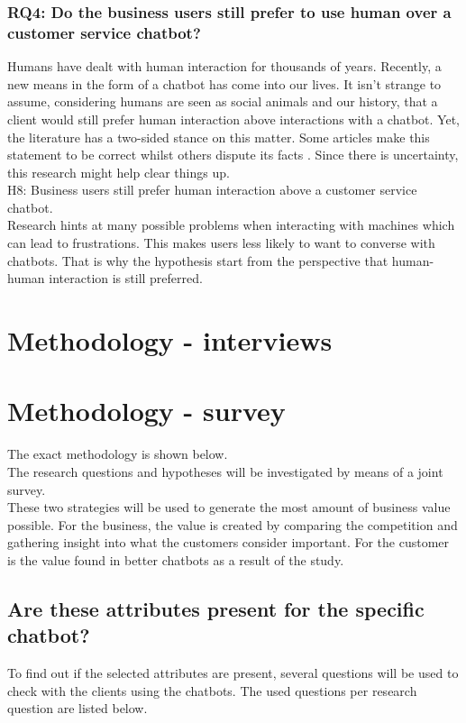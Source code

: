 \subsubsection{RQ4: Do the business users still prefer to use human over a customer service chatbot?}
Humans have dealt with human interaction for thousands of years. Recently, a new means in the form of a chatbot has come into our lives. It isn’t strange to assume, considering humans are seen as social animals and our history, that a client would still prefer human interaction above interactions with a chatbot. Yet, the literature has a two-sided stance on this matter. Some articles make this statement to be correct \citep{Ashfaq2020} whilst others dispute its facts \citep*{Muizzah2021, Radziwil2021}. Since there is uncertainty, this research might help clear things up.\\
\break
H8: Business users still prefer human interaction above a customer service chatbot.\\
\break
Research hints at many possible problems when interacting with machines which can lead to frustrations. This makes users less likely to want to converse with chatbots. \citep*{Ashfaq2020, brandtzaeg2020, Goot2020} That is why the hypothesis start from the perspective that human-human interaction is still preferred.

\section{Methodology - interviews}
\section{Methodology - survey}
The exact methodology is shown below.\\
\break
The research questions and hypotheses will be investigated by means of a joint survey.\\
\break
These two strategies will be used to generate the most amount of business value possible. For the business, the value is created by comparing the competition and gathering insight into what the customers consider important. For the customer is the value found in better chatbots as a result of the study.\\

\subsection{Are these attributes present for the specific chatbot?}
To find out if the selected attributes are present, several questions will be used to check with the clients using the chatbots. The used questions per research question are listed below.

